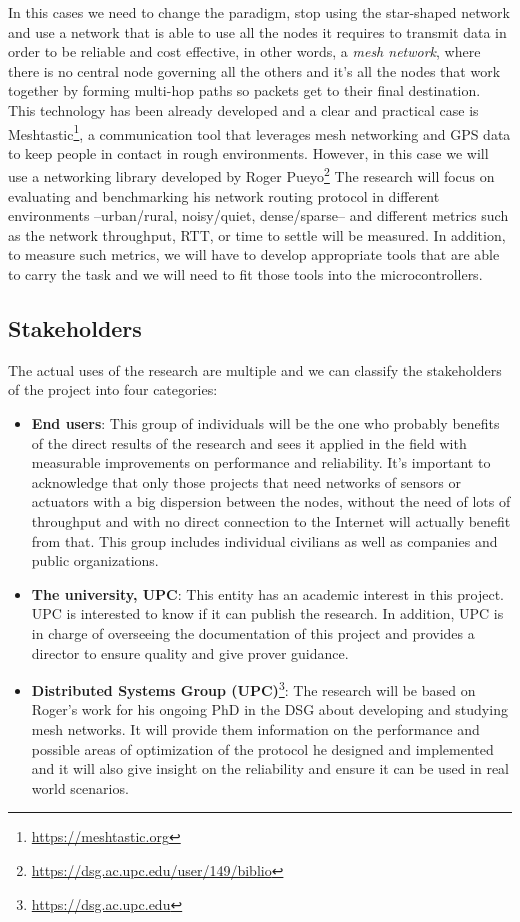 In this cases we need to  change the paradigm, stop using the star-shaped network and use a network that is able to use all the nodes it requires to transmit data in order to be reliable and cost effective, in other words, a \textit{mesh network}, where there is no central node governing all the others and it's all the nodes that work together by forming multi-hop paths so packets get to their final destination. This technology has been already developed and a clear and practical case is Meshtastic\footnote{\url{https://meshtastic.org}}, a communication tool that leverages mesh networking and GPS data to keep people in contact in rough environments.
However, in this case we will use a networking library developed by Roger Pueyo\footnote{\url{https://dsg.ac.upc.edu/user/149/biblio}}
The research will focus on evaluating and benchmarking his network routing protocol in different environments –urban/rural, noisy/quiet, dense/sparse– and different metrics such as the network throughput, RTT, or time to settle will be measured. In addition, to measure such metrics, we will have to develop appropriate tools that are able to carry the task and we will need to fit those tools into the microcontrollers.



\subsection{Stakeholders}
The actual uses of the research are multiple and we can classify the stakeholders of the project into four categories:
\begin{itemize}
\item \textbf{End users}: This group of individuals will be the one who probably benefits of the direct results of the research and sees it applied in the field with measurable improvements on performance and reliability. It's important to acknowledge that only those projects that need networks of sensors or actuators with a big dispersion between the nodes, without the need of lots of throughput and with no direct connection to the Internet will actually benefit from that. This group includes individual civilians as well as companies and public organizations.
\item \textbf{The university, UPC}: This entity has an academic interest in this project. UPC is interested to know if it can publish the research. In addition, UPC is in charge of overseeing the documentation of this project and provides a director to ensure quality and give prover guidance. 
\item \textbf{Distributed Systems Group (UPC)}\footnote{\url{https://dsg.ac.upc.edu}}: The research will be based on Roger's work for his ongoing PhD in the DSG about developing and studying mesh networks. It will provide them information on the performance and possible areas of optimization of the protocol he designed and implemented and it will also give insight on the reliability and ensure it can be used in real world scenarios. 
\end{itemize}

